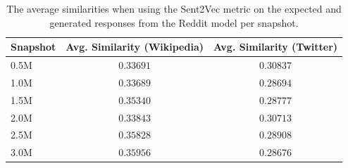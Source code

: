 \begin{table}[H]
	\centering
	\begin{adjustbox}{max width=\textwidth}
		\begin{tabular}{lcc}
			\toprule
			Snapshot & Avg. Similarity (Wikipedia) & Avg. Similarity (Twitter)\\
			\midrule
			0.5M & $0.33691$ & $0.30837$\\
			1.0M & $0.33689$ & $0.28694$\\
			1.5M & $0.35340$ & $0.28777$\\
			2.0M & $0.33843$ & $0.30713$\\
			2.5M & $0.35828$ & $0.28908$\\
			3.0M & $0.35956$ & $0.28676$\\
			\bottomrule
		\end{tabular}
	\end{adjustbox}
	\caption{The average similarities when using the Sent2Vec metric on the expected and generated responses from the Reddit model per snapshot.}
	\label{results:sent2vec:reddit:results_table}
\end{table}

